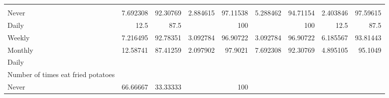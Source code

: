 \documentclass{article}
\begin{document}
\begin{tabular}{lllllllll}
  \multicolumn{1}{|r}{} &
  \multicolumn{1}{r}{} &
  \multicolumn{1}{r}{} &
  \multicolumn{1}{r}{} &
  \multicolumn{1}{r}{} &
  \multicolumn{1}{r}{} &
  \multicolumn{1}{r}{} &
  \multicolumn{1}{r}{} \\
\multicolumn{1}{l}{\hspace{7em}Never} &
  \multicolumn{1}{|r}{7.692308} &
  \multicolumn{1}{r}{92.30769} &
  \multicolumn{1}{r}{2.884615} &
  \multicolumn{1}{r}{97.11538} &
  \multicolumn{1}{r}{5.288462} &
  \multicolumn{1}{r}{94.71154} &
  \multicolumn{1}{r}{2.403846} &
  \multicolumn{1}{r}{97.59615} \\
\multicolumn{1}{l}{\hspace{7em}Daily} &
  \multicolumn{1}{|r}{12.5} &
  \multicolumn{1}{r}{87.5} &
  \multicolumn{1}{r}{} &
  \multicolumn{1}{r}{100} &
  \multicolumn{1}{r}{} &
  \multicolumn{1}{r}{100} &
  \multicolumn{1}{r}{12.5} &
  \multicolumn{1}{r}{87.5} \\
\multicolumn{1}{l}{\hspace{7em}Weekly} &
  \multicolumn{1}{|r}{7.216495} &
  \multicolumn{1}{r}{92.78351} &
  \multicolumn{1}{r}{3.092784} &
  \multicolumn{1}{r}{96.90722} &
  \multicolumn{1}{r}{3.092784} &
  \multicolumn{1}{r}{96.90722} &
  \multicolumn{1}{r}{6.185567} &
  \multicolumn{1}{r}{93.81443} \\
\multicolumn{1}{l}{\hspace{7em}Monthly} &
  \multicolumn{1}{|r}{12.58741} &
  \multicolumn{1}{r}{87.41259} &
  \multicolumn{1}{r}{2.097902} &
  \multicolumn{1}{r}{97.9021} &
  \multicolumn{1}{r}{7.692308} &
  \multicolumn{1}{r}{92.30769} &
  \multicolumn{1}{r}{4.895105} &
  \multicolumn{1}{r}{95.1049} \\
\multicolumn{1}{l}{\hspace{5em}Daily} &
  \multicolumn{1}{|r}{} &
  \multicolumn{1}{r}{} &
  \multicolumn{1}{r}{} &
  \multicolumn{1}{r}{} &
  \multicolumn{1}{r}{} &
  \multicolumn{1}{r}{} &
  \multicolumn{1}{r}{} &
  \multicolumn{1}{r}{} \\
\multicolumn{1}{l}{\hspace{6em}Number of times eat fried potatoes} &
  \multicolumn{1}{|r}{} &
  \multicolumn{1}{r}{} &
  \multicolumn{1}{r}{} &
  \multicolumn{1}{r}{} &
  \multicolumn{1}{r}{} &
  \multicolumn{1}{r}{} &
  \multicolumn{1}{r}{} &
  \multicolumn{1}{r}{} \\
\multicolumn{1}{l}{\hspace{7em}Never} &
  \multicolumn{1}{|r}{66.66667} &
  \multicolumn{1}{r}{33.33333} &
  \multicolumn{1}{r}{} &
  \multicolumn{1}{r}{100} &

\end{tabular}
\end{document}
